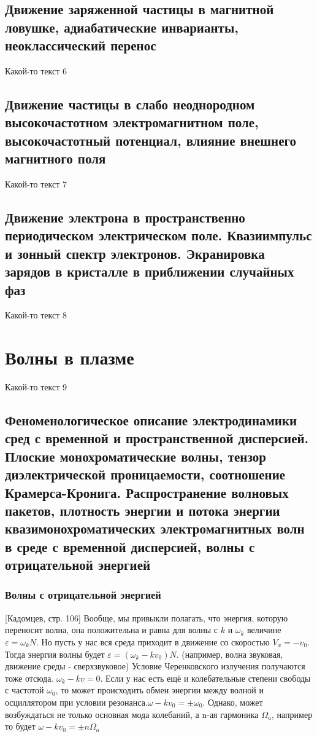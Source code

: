 \documentclass[10pt, a4paper]{article}
\let\stdsection\section
\renewcommand\section{\newpage\stdsection}
\begin{document}
\subsection{Движение заряженной частицы в магнитной ловушке, адиабатические инварианты, неоклассический перенос}

Какой-то текст 6

\subsection{Движение частицы в слабо неоднородном высокочастотном электромагнитном поле, высокочастотный потенциал, влияние внешнего магнитного поля}

Какой-то текст 7

\subsection{Движение электрона в пространственно периодическом электрическом поле. Квазиимпульс и зонный спектр электронов. Экранировка зарядов в кристалле в приближении случайных фаз}

Какой-то текст 8

\section{Волны в плазме}

Какой-то текст 9

\subsection{Феноменологическое описание электродинамики сред с временной и пространственной дисперсией. Плоские монохроматические волны, тензор диэлектрической проницаемости, 	соотношение Крамерса-Кронига. Распространение волновых пакетов, плотность энергии и потока энергии квазимонохроматических электромагнитных волн в среде с временной дисперсией, волны с отрицательной энергией}
\subsubsection{Волны с отрицательной энергией}

[Кадомцев, стр. 106]
Вообще, мы привыкли полагать, что энергия, которую переносит волна, она положительна и равна для волны с $k$ и $\omega_k $ величине $\varepsilon= \omega_k N$.
Но пусть у нас вся среда приходит в движение со скоростью $V_x=-v_0$. Тогда энергия волны будет $\varepsilon= (\omega_k-kv_0) N$. (например, волна звуковая, движение среды - сверхзвуковое)
Условие Черенковского излучения получаются тоже отсюда. $\omega_k -kv=0$.
Если у нас есть ещё и колебательные степени свободы с частотой $\omega_0$, то может происходить обмен энергии между волной и осциллятором при условии резонанса.$\omega-kv_0=\pm \omega_0$.
Однако, может возбуждаться не только основная мода колебаний, а n-ая гармоника $\Omega_a$, например
то будет $\omega-kv_0=\pm n \Omega_a$
\end{document}

